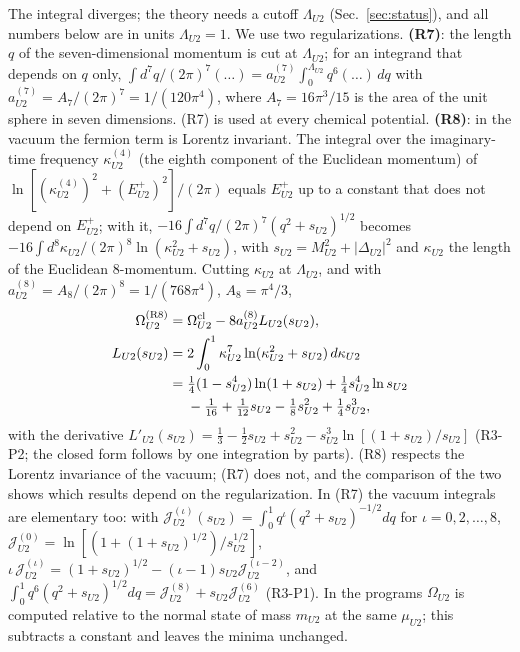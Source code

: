 The integral diverges; the theory needs a cutoff $\Lambda_{U2}$ (Sec.~\ref{sec:status}), and all
numbers below are in units $\Lambda_{U2}=1$. We use two regularizations. \textbf{(R7)}: the length
$q$ of the seven-dimensional momentum is cut at $\Lambda_{U2}$; for an integrand that depends on $q$
only, $\int d^7q/(2\pi)^7(\dots)=a^{(7)}_{U2}\int_0^{\Lambda_{U2}}q^6(\dots)\,dq$ with
$a^{(7)}_{U2}=A_7/(2\pi)^7=1/(120\pi^4)$, where $A_7=16\pi^3/15$ is the area of the unit sphere in
seven dimensions. (R7) is used at every chemical potential. \textbf{(R8)}: in the vacuum the
fermion term is Lorentz invariant. The integral over the imaginary-time frequency
$\kappa^{(4)}_{U2}$ (the eighth component of the Euclidean momentum) of
$\ln[(\kappa^{(4)}_{U2})^2+(E^+_{U2})^2]/(2\pi)$ equals $E^+_{U2}$ up to a constant that does not
depend on $E^+_{U2}$; with it, $-16\int d^7q/(2\pi)^7(q^2+s_{U2})^{1/2}$ becomes
$-16\int d^8\kappa_{U2}/(2\pi)^8\ln(\kappa^2_{U2}+s_{U2})$, with $s_{U2}=M^2_{U2}+|\Delta_{U2}|^2$ and
$\kappa_{U2}$ the length of the Euclidean 8-momentum. Cutting $\kappa_{U2}$ at $\Lambda_{U2}$, and with
$a^{(8)}_{U2}=A_8/(2\pi)^8=1/(768\pi^4)$, $A_8=\pi^4/3$,
\begin{equation}
\begin{aligned}
\Omega_{U2}^{\rm (R8)}={}&\Omega^{\rm cl}_{U2}-8a^{(8)}_{U2}L_{U2}(s_{U2}),\\
L_{U2}(s_{U2})={}&2\int_0^1\kappa_{U2}^7\ln(\kappa_{U2}^2+s_{U2})\,d\kappa_{U2}\\
={}&\tfrac14(1-s_{U2}^4)\ln(1+s_{U2})+\tfrac14s_{U2}^4\ln s_{U2}\\
&-\tfrac1{16}+\tfrac1{12}s_{U2}-\tfrac18s_{U2}^2+\tfrac14s_{U2}^3,
\end{aligned}
\label{eq:OmegaR8}
\end{equation}
with the derivative $L'_{U2}(s_{U2})=\tfrac13-\tfrac12s_{U2}+s_{U2}^2-s_{U2}^3\ln[(1+s_{U2})/s_{U2}]$
(R3-P2; the closed form follows by one integration by parts). (R8) respects the Lorentz invariance
of the vacuum; (R7) does not, and the comparison of the two shows which results depend on the
regularization. In (R7) the vacuum integrals are elementary too: with
$\mathcal J^{(\iota)}_{U2}(s_{U2})=\int_0^1q^\iota(q^2+s_{U2})^{-1/2}dq$ for $\iota=0,2,\dots,8$,
$\mathcal J^{(0)}_{U2}=\ln[(1+(1+s_{U2})^{1/2})/s^{1/2}_{U2}]$,
$\iota\,\mathcal J^{(\iota)}_{U2}=(1+s_{U2})^{1/2}-(\iota-1)s_{U2}\mathcal J^{(\iota-2)}_{U2}$, and
$\int_0^1q^6(q^2+s_{U2})^{1/2}dq=\mathcal J^{(8)}_{U2}+s_{U2}\mathcal J^{(6)}_{U2}$ (R3-P1). In the
programs $\Omega_{U2}$ is computed relative to the normal state of mass $m_{U2}$ at the same
$\mu_{U2}$; this subtracts a constant and leaves the minima unchanged.

